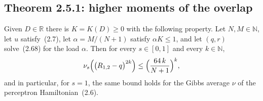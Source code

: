 \subsection{Theorem 2.5.1: higher moments of the overlap}\label{sub:sg-tal:perceptron-exponential-overlap}

\begin{theorem}\label{thm:sg-tal:perceptron-overlap-high-moments}
  \leanok
Given $D\in\mathbb R$ there is $K=K(D)\ge0$ with the following property. Let $N,M\in\mathbb N$, let $u$
satisfy~(2.7), let $\alpha=M/(N+1)$ satisfy $\alpha K\le 1$, and let $(q,r)$ solve~(2.68) for the load $\alpha$.
Then for every $s\in[0,1]$ and every $k\in\mathbb N$,
\[
 \nu_s\Bigl(\bigl(R_{1,2}-q\bigr)^{2k}\Bigr)\le\Bigl(\frac{64\,k}{N+1}\Bigr)^{k},
\]
and in particular, for $s=1$, the same bound holds for the Gibbs average $\nu$ of the perceptron
Hamiltonian~(2.6).
\end{theorem}
